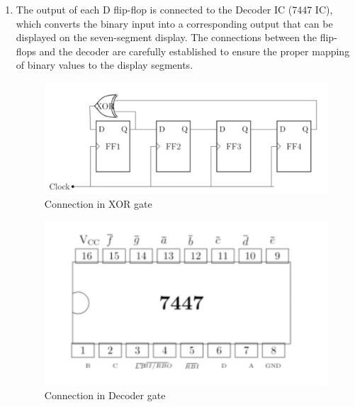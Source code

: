 \documentclass[journal,12pt,twocolumn]{IEEEtran}
\begin{document}
\begin{enumerate}
	\item The output of each D flip-flop is connected to the Decoder IC (7447 IC), which converts the binary input into a corresponding output that can be displayed on the seven-segment display. The connections between the flip-flops and the decoder are carefully established to ensure the proper mapping of binary values to the display segments.
	\begin{figure}[h]
		\includegraphics[width=\linewidth]{images/fig04.jpg}
		\caption{Connection in XOR gate}
		\label{XOR}
	\end{figure}
	\begin{figure}[h]
		\includegraphics[width=\linewidth]{images/fig01.jpg}
		\caption{Connection in Decoder gate}
		\label{7447}
	\end{figure}
		

\end{enumerate}
\end{document}
